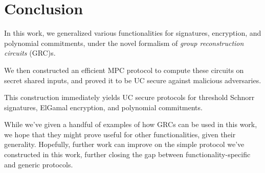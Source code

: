 \section{Conclusion}

In this work, we generalized various functionalities for
signatures, encryption, and polynomial commitments,
under the novel formalism of \emph{group reconstruction circuits} (GRC)s.

We then constructed an efficient MPC protocol to compute these circuits
on secret shared inputs, and proved it to be UC secure against
malicious adversaries.

This construction immediately yields UC secure protocols for threshold Schnorr
signatures, ElGamal encryption, and polynomial commitments.

While we've given a handful of examples of how GRCs can be used
in this work, we hope that they might prove useful for other functionalities,
given their generality.
Hopefully, further work can improve on the simple protocol we've
constructed in this work, further closing the gap between
functionality-specific and generic protocols.


\small 

